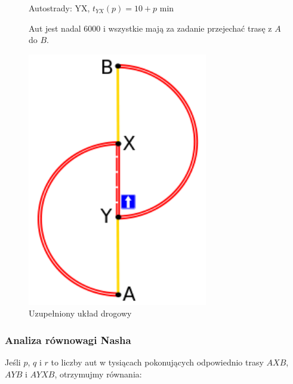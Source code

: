 \documentclass[twoside,12pt]{report}
\begin{document}
\vspace*{60px}
\begin{figure}[h]
\begin{flushleft}
	\begin{minipage}{.50\textwidth}
	Autostrady:\newline
	YX, $t_{YX}(p) =  10 + p$ min\newline
	
	\vspace*{15px}
	Aut jest nadal 6000 i wszystkie mają za zadanie przejechać trasę z $A$ do $B$.
	\end{minipage}%
\end{flushleft}
\begin{flushright}
	\begin{minipage}{.50\textwidth}
	\centering
	\includegraphics[width=0.7\textwidth]{img/braess2}
	\caption{Uzupełniony układ drogowy}
	\end{minipage}
\end{flushright}
\end{figure}

\subsubsection{Analiza równowagi Nasha}

Jeśli $p$, $q$ i $r$ to liczby aut w tysiącach pokonujących odpowiednio trasy $AXB$, $AYB$ i $AYXB$, otrzymujmy równania:
\end{document}
